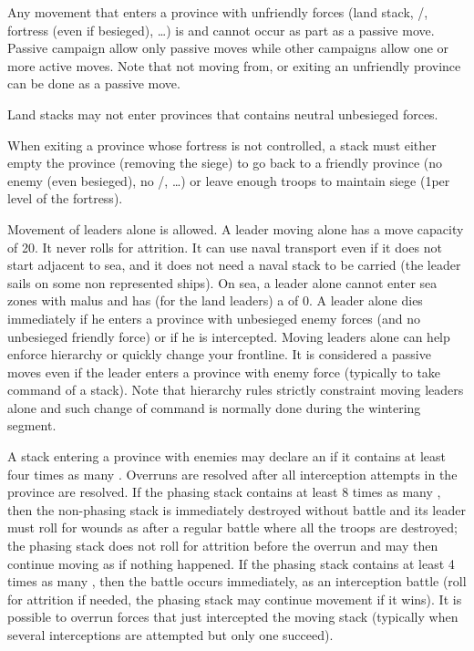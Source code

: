 Any movement that enters a province with unfriendly forces (land stack,
\REVOLT/\REBELLION, fortress (even if besieged), \ldots) is  and
cannot occur as part as a passive move. Passive campaign allow only passive
moves while other campaigns allow one or more active moves. Note that not
moving from, or exiting an unfriendly province can be done as a passive move.

Land stacks may not enter provinces that contains neutral unbesieged forces.

When exiting a province whose fortress is not controlled, a stack must either
empty the province (removing the siege) to go back to a friendly province (no
enemy (even besieged), no \REVOLT/\REBELLION, \ldots) or leave enough troops
to maintain siege (1\LD per level of the fortress).

Movement of leaders alone is allowed. A leader moving alone has a move
capacity of 20\MP. It never rolls for attrition. It can use naval transport
even if it does not start adjacent to sea, and it does not need a naval stack
to be carried (the leader sails on some non represented ships). On sea, a
leader alone cannot enter sea zones with malus and has (for the land leaders)
a \Man of 0. A leader alone dies immediately if he enters a province with
unbesieged enemy forces (and no unbesieged friendly force) or if he is
intercepted. Moving leaders alone can help enforce hierarchy or quickly change
your frontline. It is considered a passive moves even if the leader enters a
province with enemy force (typically to take command of a stack). Note that
hierarchy rules strictly constraint moving leaders alone and such change of
command is normally done during the wintering segment.

A stack entering a province with enemies may declare an  if it
contains at least four times as many \LD. Overruns are resolved after all
interception attempts in the province are resolved. If the phasing stack
contains at least 8 times as many \LD, then the non-phasing stack is
immediately destroyed without battle and its leader must roll for wounds as
after a regular battle where all the troops are destroyed; the phasing stack
does not roll for attrition before the overrun and may then continue moving as
if nothing happened. If the phasing stack contains at least 4 times as many
\LD, then the battle occurs immediately, as an interception battle (roll for
attrition if needed, the phasing stack may continue movement if it wins). It
is possible to overrun forces that just intercepted the moving stack
(typically when several interceptions are attempted but only one succeed).

